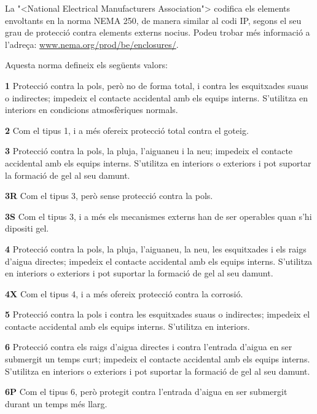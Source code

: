 La {"<}National Electrical Manufacturers Association{">}
codifica els elements envoltants en la norma \textsf{NEMA 250}, de manera similar al codi \textsf{IP}, segons el seu grau de protecci\'{o} contra elements externs nocius. Podeu trobar m\'{e}s informaci\'{o} a l'adre\c{c}a: \href{http://www.nema.org/prod/be/enclosures/}{www.nema.org/prod/be/enclosures/}.

Aquesta norma defineix els seg\"{u}ents valors:

\begin{list}{}
   {\setlength{\labelwidth}{10mm} \setlength{\leftmargin}{10mm} \setlength{\labelsep}{2mm}}
   \item[\textbf{1}] Protecci\'{o} contra la pols, per\`{o} no de forma total, i contra les esquitxades suaus o indirectes; impedeix el contacte accidental amb els equips interns. S'utilitza en interiors en condicions atmosf\`{e}riques normals.
   \item[\textbf{2}] Com el tipus 1, i a m\'{e}s ofereix protecci\'{o} total contra el goteig.
   \item[\textbf{3}] Protecci\'{o} contra la pols, la pluja, l'aiguaneu i la neu; impedeix el contacte accidental amb els equips interns. S'utilitza en interiors o exteriors i pot suportar la formaci\'{o} de gel al seu damunt.
   \item[\textbf{3R}] Com el tipus 3, per\`{o} sense protecci\'{o} contra la pols.
   \item[\textbf{3S}] Com el tipus 3, i a m\'{e}s els mecanismes externs han de ser operables quan s'hi dipositi gel.
    \item[\textbf{4}] Protecci\'{o} contra la pols, la pluja, l'aiguaneu, la neu, les esquitxades i els raigs d'aigua directes; impedeix el contacte accidental amb els equips interns. S'utilitza en interiors o exteriors i pot suportar la formaci\'{o} de gel al seu damunt.
   \item[\textbf{4X}] Com el tipus 4, i a m\'{e}s ofereix protecci\'{o} contra la corrosi\'{o}.
   \item[\textbf{5}] Protecci\'{o} contra la pols i contra les esquitxades suaus o indirectes; impedeix el contacte accidental amb els equips interns. S'utilitza en interiors.
   \item[\textbf{6}] Protecci\'{o} contra els raigs d'aigua directes i contra l'entrada d'aigua en ser submergit un temps curt; impedeix el contacte accidental amb els equips interns. S'utilitza en interiors o exteriors i pot suportar la formaci\'{o} de gel al seu damunt.
   \item[\textbf{6P}] Com el tipus 6, per\`{o} protegit contra l'entrada d'aigua en ser submergit durant un temps m\'{e}s llarg.

\end{list}
